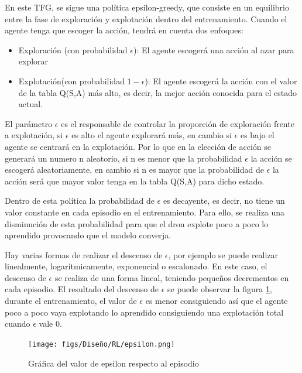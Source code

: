 \begin{itemize}
    En este TFG, se sigue una política epsilon-greedy\cite{Epsilon-greedy}, que consiste en un equilibrio entre la fase de exploración y explotación dentro 
    del entrenamiento. Cuando el agente tenga que escoger la acción, tendrá en cuenta dos enfoques:
 
 \begin{itemize}
   \item Exploración (con probabilidad $\epsilon$): El agente escogerá una acción al azar para explorar
   \item Explotación(con probabilidad $ 1 - \epsilon$): El agente escogerá la acción con el valor de la tabla Q(S,A) más alto, es decir, la mejor acción conocida para el estado actual.
 \end{itemize}
 
 El parámetro $\epsilon$ es el responsable de controlar la proporción de exploración frente a explotación, si $\epsilon$ es alto el agente explorará más, en cambio si $\epsilon$ es bajo
 el agente se centrará en la explotación. Por lo que en la elección de acción se generará un numero n aleatorio, si n es menor que la probabilidad $\epsilon$ la acción se escogerá aleatoriamente, 
 en cambio si n es mayor que la probabilidad de $\epsilon$ la acción será que mayor valor tenga en la tabla Q(S,A) para dicho estado. \newline
 
 Dentro de esta política la probabilidad de $\epsilon$ es decayente, es decir, no tiene un valor constante en cada episodio en el entrenamiento. Para ello, se realiza una disminución 
 de esta probabilidad para que el dron explote poco a poco lo aprendido provocando que el modelo converja. 
 
 Hay varias formas de realizar el descenso
 de $\epsilon$, por ejemplo se puede realizar linealmente, logarítmicamente, exponencial o escalonado. En este caso, el descenso de $\epsilon$ se realiza 
 de una forma lineal, teniendo pequeños decrementos en cada episodio. El resultado del descenso de $\epsilon$ se puede observar la figura \ref{fig:epsilon}, durante el entrenamiento, el valor
 de $\epsilon$ es menor consiguiendo así que el agente poco a poco vaya explotando lo aprendido consiguiendo una explotación total cuando $\epsilon$ vale 0. 

 \begin{figure} [H]
  \begin{center}
    \texttt{[image: figs/Diseño/RL/epsilon.png]}
  \end{center}
  \caption{Gráfica del valor de epsilon respecto al episodio}
  \label{fig:epsilon}
\end{figure}
  \end{itemize}

